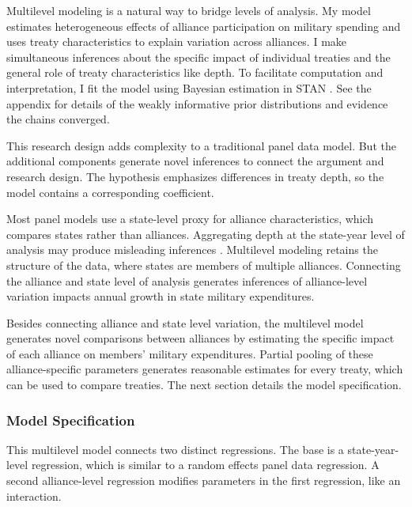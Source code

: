 \documentclass[12pt]{article}
\begin{document}
Multilevel modeling is a natural way to bridge levels of analysis.
My model estimates heterogeneous effects of alliance participation on military spending and uses treaty characteristics to explain variation across alliances. 
I make simultaneous inferences about the specific impact of individual treaties and the general role of treaty characteristics like depth. 
To facilitate computation and interpretation, I fit the model using Bayesian estimation in STAN \citep{Carpenteretal2016}. 
See the appendix for details of the weakly informative prior distributions and evidence the chains converged.


This research design adds complexity to a traditional panel data model. 
But the additional components generate novel inferences to connect the argument and research design. 
The hypothesis emphasizes differences in treaty depth, so the model contains a corresponding coefficient.


Most panel models use a state-level proxy for alliance characteristics, which compares states rather than alliances.
Aggregating depth at the state-year level of analysis may produce misleading inferences \citep{McElreath2016}.
Multilevel modeling retains the structure of the data, where states are members of multiple alliances. 
Connecting the alliance and state level of analysis generates inferences of alliance-level variation impacts annual growth in state military expenditures. 


Besides connecting alliance and state level variation, the multilevel model generates novel comparisons between alliances by estimating the specific impact of each alliance on members' military expenditures. 
Partial pooling of these alliance-specific parameters generates reasonable estimates for every treaty, which can be used to compare treaties. 
The next section details the model specification. 
 


\subsubsection{Model Specification} 

This multilevel model connects two distinct regressions. 
The base is a state-year-level regression, which is similar to a random effects panel data regression.
A second alliance-level regression modifies parameters in the first regression, like an interaction. 
\end{document}

